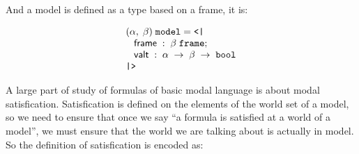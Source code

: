 \documentclass{report}
\newenvironment{holmath}{\begin{displaymath}\begin{array}{l}}{\end{array}\end{displaymath}\ignorespacesafterend}
\begin{document}
And a model is defined as a type based on a frame, it is:

\begin{holmath}
  (\ensuremath{\alpha},\;\ensuremath{\beta})\;\HOLTyOp{model} = \HOLTokenLeftrec{}\\
\;\;\;\HOLFieldName{frame}\;:\;\ensuremath{\beta}\;\HOLTyOp{frame};\\
\;\;\;\HOLFieldName{valt}\;:\;\ensuremath{\alpha}\;\ensuremath{\rightarrow}\;\ensuremath{\beta}\;\ensuremath{\rightarrow}\;\HOLTyOp{bool}\\
\HOLTokenRightrec{}
\end{holmath}

A large part of study of formulas of basic modal language is about modal satisfication. Satisfication is defined on the elements of the world set of a model, so we need to ensure that once we say ``a formula is satisfied at a world of a model'', we must ensure that the world we are talking about is actually in model. So the definition of satisfication is encoded as:
\end{document}
